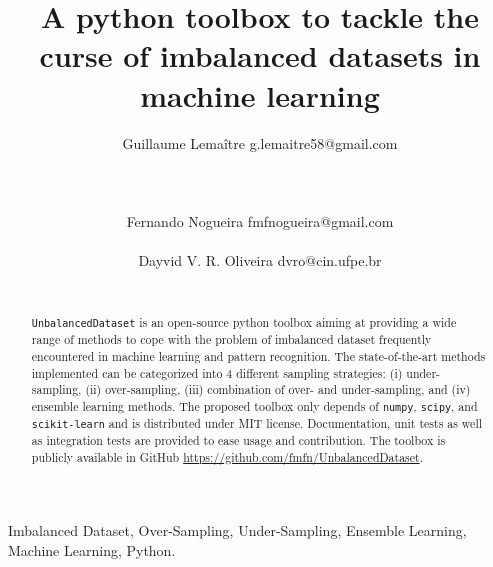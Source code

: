 \documentclass[twoside,11pt]{article}
\begin{document}
\title{A python toolbox to tackle the curse of imbalanced datasets in machine learning}
\author{Guillaume Lema\^itre \email g.lemaitre58@gmail.com \\ 
     \\ 
     \\ 
     \\ 
        \AND
        Fernando Nogueira \email fmfnogueira@gmail.com \\ 
         \\ 
        \AND
        Dayvid V. R. Oliveira \email dvro@cin.ufpe.br \\ 
         \\ 
        } 
\editor{-}

\maketitle

\begin{abstract}
\texttt{UnbalancedDataset} is an open-source python toolbox aiming at providing a wide range of methods to cope with the problem of imbalanced dataset frequently encountered in machine learning and pattern recognition.
The state-of-the-art methods implemented can be categorized into 4 different sampling strategies: (i) under-sampling, (ii) over-sampling, (iii) combination of over- and under-sampling, and (iv) ensemble learning methods.
The proposed toolbox only depends of \texttt{numpy}, \texttt{scipy}, and \texttt{scikit-learn} and is distributed under MIT license.
Documentation, unit tests as well as integration tests are provided to ease usage and contribution.
The toolbox is publicly available in GitHub \url{https://github.com/fmfn/UnbalancedDataset}.
\end{abstract}

\begin{keywords}
Imbalanced Dataset, Over-Sampling, Under-Sampling, Ensemble Learning, Machine Learning, Python.
\end{keywords}
\end{document}
